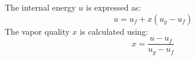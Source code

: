 The internal energy \( u \) is expressed as:  
\[
u = u_f + x (u_g - u_f)
\]  
The vapor quality \( x \) is calculated using:  
\[
x = \frac{u - u_f}{u_g - u_f}
\]